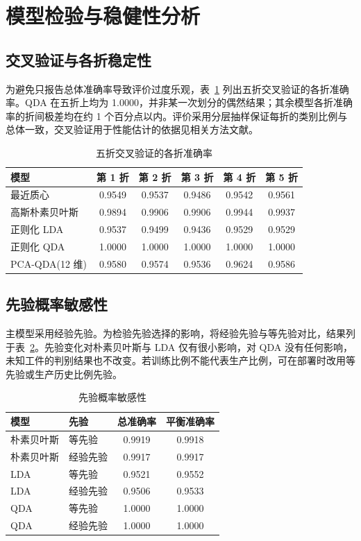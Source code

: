\documentclass[12pt,a4paper]{article}
\newcommand{\upcite}[1]{\cite{#1}}
\begin{document}
\section{模型检验与稳健性分析}
\subsection{交叉验证与各折稳定性}

为避免只报告总体准确率导致评价过度乐观，表~\ref{tab:fold} 列出五折交叉验证的各折准确率。QDA 在五折上均为 1.0000，并非某一次划分的偶然结果；其余模型各折准确率的折间极差均在约 1 个百分点以内。评价采用分层抽样保证每折的类别比例与总体一致，交叉验证用于性能估计的依据见相关方法文献\upcite{kohavi1995}。

\begin{table}[H]
\centering
\caption{五折交叉验证的各折准确率}
\label{tab:fold}
\begin{tabular}{lccccc}
\toprule
模型 & 第 1 折 & 第 2 折 & 第 3 折 & 第 4 折 & 第 5 折 \\
\midrule
最近质心       & 0.9549 & 0.9537 & 0.9486 & 0.9542 & 0.9561 \\
高斯朴素贝叶斯 & 0.9894 & 0.9906 & 0.9906 & 0.9944 & 0.9937 \\
正则化 LDA     & 0.9537 & 0.9499 & 0.9436 & 0.9529 & 0.9529 \\
正则化 QDA     & 1.0000 & 1.0000 & 1.0000 & 1.0000 & 1.0000 \\
PCA-QDA(12 维) & 0.9580 & 0.9574 & 0.9536 & 0.9624 & 0.9586 \\
\bottomrule
\end{tabular}
\end{table}

\subsection{先验概率敏感性}

主模型采用经验先验。为检验先验选择的影响，将经验先验与等先验对比，结果列于表~\ref{tab:prior}。先验变化对朴素贝叶斯与 LDA 仅有很小影响，对 QDA 没有任何影响，未知工件的判别结果也不改变。若训练比例不能代表生产比例，可在部署时改用等先验或生产历史比例先验。

\begin{table}[H]
\centering
\caption{先验概率敏感性}
\label{tab:prior}
\begin{tabular}{llcc}
\toprule
模型 & 先验 & 总准确率 & 平衡准确率 \\
\midrule
朴素贝叶斯 & 等先验   & 0.9919 & 0.9918 \\
朴素贝叶斯 & 经验先验 & 0.9917 & 0.9917 \\
LDA       & 等先验   & 0.9521 & 0.9552 \\
LDA       & 经验先验 & 0.9506 & 0.9533 \\
QDA       & 等先验   & 1.0000 & 1.0000 \\
QDA       & 经验先验 & 1.0000 & 1.0000 \\
\bottomrule
\end{tabular}
\end{table}
\end{document}
